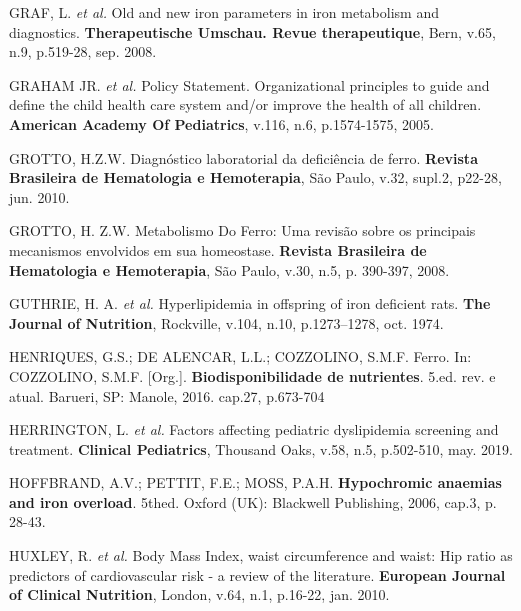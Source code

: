 \bigbreak

\noindent GRAF, L. \textit{et al.} Old and new iron parameters in iron metabolism and diagnostics. \textbf{Therapeutische Umschau. Revue therapeutique}, Bern, v.65, n.9, p.519-28, sep. 2008.

\bigbreak

\noindent GRAHAM JR. \textit{et al.} Policy Statement. Organizational principles to guide and define the child health care system and/or improve the health of all children. \textbf{American Academy Of Pediatrics}, v.116, n.6, p.1574-1575, 2005. 

\bigbreak

\noindent GROTTO, H.Z.W. Diagnóstico laboratorial da deficiência de ferro. \textbf{Revista Brasileira de Hematologia e Hemoterapia}, São Paulo, v.32, supl.2, p22-28, jun. 2010.

\bigbreak

\noindent GROTTO, H. Z.W. Metabolismo Do Ferro: Uma revisão sobre os principais mecanismos envolvidos em sua homeostase. \textbf{Revista Brasileira de Hematologia e Hemoterapia}, São Paulo, v.30, n.5, p. 390-397, 2008.

\bigbreak

\noindent GUTHRIE, H. A. \textit{et al.} Hyperlipidemia in offspring of iron deficient rats. \textbf{The Journal of Nutrition}, Rockville, v.104, n.10, p.1273–1278, oct. 1974.

\bigbreak

\noindent HENRIQUES, G.S.; DE ALENCAR, L.L.; COZZOLINO, S.M.F. Ferro. In: COZZOLINO, S.M.F. [Org.]. \textbf{Biodisponibilidade de nutrientes}. 5.ed. rev. e atual. Barueri, SP: Manole, 2016. cap.27, p.673-704

\bigbreak

\noindent HERRINGTON, L. \textit{et al.} Factors affecting pediatric dyslipidemia screening and treatment. \textbf{Clinical Pediatrics}, Thousand Oaks, v.58, n.5, p.502-510, may. 2019.

\bigbreak

\noindent HOFFBRAND, A.V.; PETTIT, F.E.; MOSS, P.A.H. \textbf{Hypochromic anaemias and iron overload}. 5thed. Oxford (UK): Blackwell Publishing, 2006, cap.3, p. 28-43. 

\bigbreak

\noindent HUXLEY, R. \textit{et al.} Body Mass Index, waist circumference and waist: Hip ratio as predictors of cardiovascular risk - a review of the literature. \textbf{European Journal of Clinical Nutrition}, London, v.64, n.1, p.16-22, jan. 2010.

